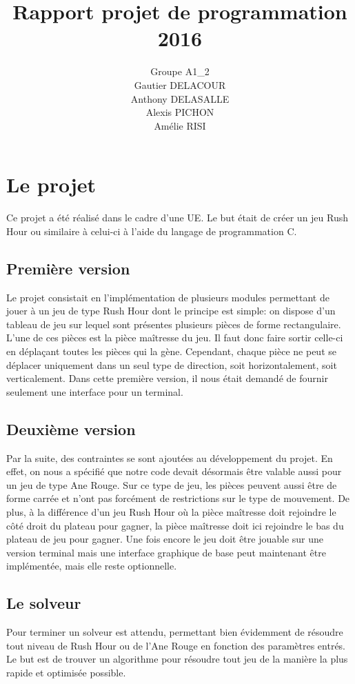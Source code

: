 \documentclass{report}
\title{Rapport projet de programmation 2016}
\author{Groupe A1\_2\\Gautier DELACOUR\\Anthony DELASALLE\\Alexis PICHON\\Amélie RISI}
\begin{document}
\maketitle
\tableofcontents

\chapter{Le projet}
Ce projet a été réalisé dans le cadre d'une UE. Le but était de créer un jeu Rush Hour ou similaire à celui-ci à l'aide du langage de programmation C. 
\section{Première version}
Le projet consistait en l'implémentation de plusieurs modules permettant de jouer à un jeu de type Rush Hour dont le principe est simple: on dispose d'un tableau de jeu sur lequel sont présentes plusieurs pièces de forme rectangulaire. L'une de ces pièces est la pièce maîtresse du jeu. Il faut donc faire sortir celle-ci en déplaçant toutes les pièces qui la gène. Cependant, chaque pièce ne peut se déplacer uniquement dans un seul type de direction, soit horizontalement, soit verticalement.
Dans cette première version, il nous était demandé de fournir seulement une interface pour un terminal.

\section{Deuxième version}
Par la suite, des contraintes se sont ajoutées au développement du projet. En effet, on nous a spécifié que notre code devait désormais être valable aussi pour un jeu de type Ane Rouge. Sur ce type de jeu, les pièces peuvent aussi être de forme carrée et n'ont pas forcément de restrictions sur le type de mouvement. De plus, à la différence d'un jeu Rush Hour où la pièce maîtresse doit rejoindre le côté droit du plateau pour gagner, la pièce maîtresse doit ici rejoindre le bas du plateau de jeu pour gagner.
Une fois encore le jeu doit être jouable sur une version terminal mais une interface graphique de base peut maintenant être implémentée, mais elle reste optionnelle.

\section{Le solveur}
Pour terminer un solveur est attendu, permettant bien évidemment de résoudre tout niveau de Rush Hour ou de l'Ane Rouge en fonction des paramètres entrés. Le but est de trouver un algorithme pour résoudre tout jeu de la manière la plus rapide et optimisée possible.
\end{document}
